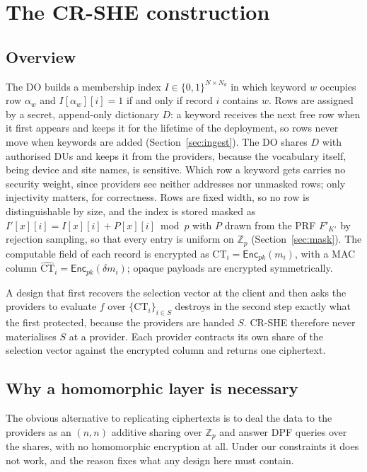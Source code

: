 \documentclass[a4paper,fleqn]{cas-sc}
\newcommand{\Enc}{\mathsf{Enc}}
\begin{document}
\section{The CR-SHE construction}
\label{sec:construction}

\subsection{Overview}
The DO builds a membership index $I\in\{0,1\}^{N\times N_d}$ in which keyword
$w$ occupies row $\alpha_w$ and $I[\alpha_w][i]=1$ if and only if record $i$
contains $w$. Rows are assigned by a secret, append-only dictionary $D$: a
keyword receives the next free row when it first appears and keeps it for the
lifetime of the deployment, so rows never move when keywords are added
(Section~\ref{sec:ingest}). The DO shares $D$ with authorised DUs and keeps it
from the providers, because the vocabulary itself, being device and site
names, is sensitive. Which row a keyword gets carries no security weight,
since providers see neither addresses nor unmasked rows; only injectivity
matters, for correctness. Rows are fixed width, so no row is distinguishable
by size, and the index is stored masked as $I'[x][i]=I[x][i]+P[x][i]\bmod p$
with $P$ drawn from the PRF $F'_{K'}$ by rejection sampling, so that every
entry is uniform on $\mathbb{Z}_p$ (Section~\ref{sec:mask}).
The computable field of each record is encrypted as
$\text{CT}_i=\Enc_{pk}(m_i)$, with a MAC column
$\widehat{\text{CT}}_i=\Enc_{pk}(\delta m_i)$; opaque payloads are encrypted
symmetrically.

A design that first recovers the selection vector at the client and then asks
the providers to evaluate $f$ over $\{\text{CT}_i\}_{i\in S}$ destroys in the
second step exactly what the first protected, because the providers are handed
$S$. CR-SHE therefore never materialises $S$ at a provider. Each provider
contracts its own share of the selection vector against the encrypted column
and returns one ciphertext.

\subsection{Why a homomorphic layer is necessary}
\label{sec:whyrep}
The obvious alternative to replicating ciphertexts is to deal the data to the
providers as an $(n,n)$ additive sharing over $\mathbb{Z}_p$ and answer DPF
queries over the shares, with no homomorphic encryption at all. Under our
constraints it does not work, and the reason fixes what any design here must
contain.
\end{document}

